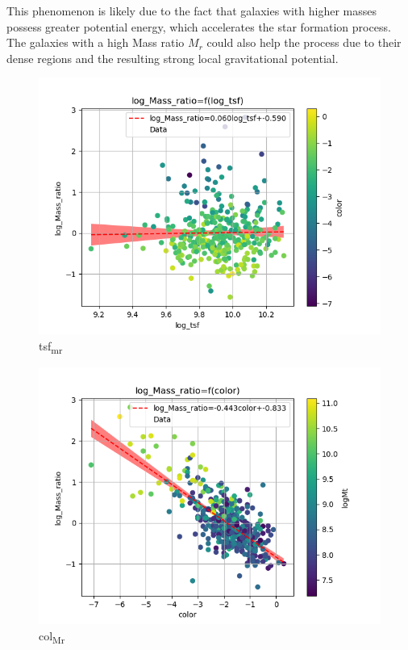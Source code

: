 \documentclass[a4paper,twocolumn]{article}
\begin{document}
This phenomenon is likely due to the fact that galaxies with higher masses possess greater potential energy, which accelerates the star formation process. The galaxies with a high Mass ratio \(M_r\) could also help the process due to their dense regions and the resulting strong local gravitational potential.


\begin{figure}[!htpb]
\centering
\includegraphics[width=.9\linewidth]{./figs/log_tsf-log_Mass_ratio-color_color.png}
\caption{\label{fig:tsf_mr}tsf\textsubscript{mr}}
\end{figure}


\begin{figure}[!htpb]
\centering
\includegraphics[width=.9\linewidth]{./figs/color-log_Mass_ratio-color_logMt.png}
\caption{\label{fig:col_Mr}col\textsubscript{Mr}}
\end{figure}
\end{document}
